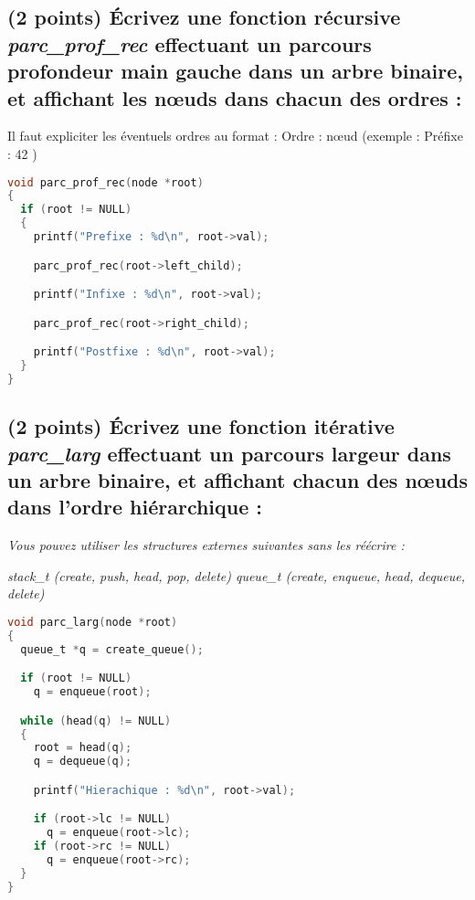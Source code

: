 \documentclass[11pt,a4paper]{article}
\begin{document}

\subsection{(2 points) \'Ecrivez une fonction récursive \og \textit{parc\_prof\_rec} \fg{} effectuant un parcours profondeur main gauche dans un arbre binaire, et affichant les nœuds dans chacun des ordres : }

\noindent Il faut expliciter les éventuels ordres au format : \og Ordre : nœud \fg{} (exemple : \og Préfixe : 42 \fg{})

\vfillFirst

\begin{lstlisting}[language=C]
void parc_prof_rec(node *root)
{
  if (root != NULL)
  {
    printf("Prefixe : %d\n", root->val);

    parc_prof_rec(root->left_child);

    printf("Infixe : %d\n", root->val);

    parc_prof_rec(root->right_child);

    printf("Postfixe : %d\n", root->val);
  }
}
\end{lstlisting}

\vfillLast

\clearpage


\subsection{(2 points) \'Ecrivez une fonction itérative \og \textit{parc\_larg} \fg{} effectuant un parcours largeur dans un arbre binaire, et affichant chacun des nœuds dans l'ordre hiérarchique : }



\noindent \textit{Vous pouvez utiliser les structures externes suivantes sans les réécrire :}

\noindent \textit{stack\_t (create, push, head, pop, delete) \hfill queue\_t (create, enqueue, head, dequeue, delete) }

\bigskip

\begin{lstlisting}[language=C]
void parc_larg(node *root)
{
  queue_t *q = create_queue();

  if (root != NULL)
    q = enqueue(root);

  while (head(q) != NULL)
  {
    root = head(q);
    q = dequeue(q);

    printf("Hierachique : %d\n", root->val);

    if (root->lc != NULL)
      q = enqueue(root->lc);
    if (root->rc != NULL)
      q = enqueue(root->rc);
  }
}
\end{lstlisting}
\end{document}
